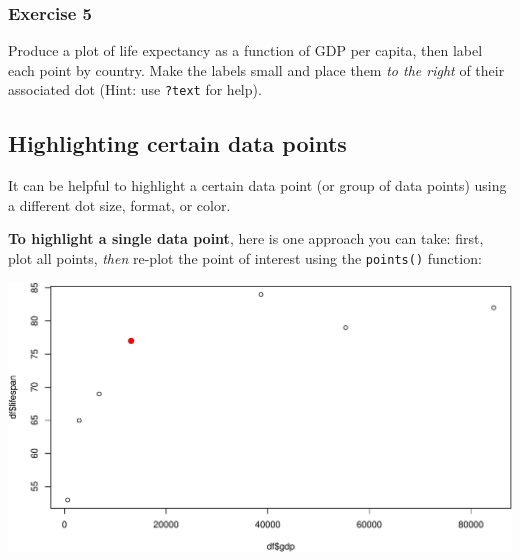 \documentclass[
]{book}
\newenvironment{Shaded}{\begin{snugshade}}{\end{snugshade}}
\newcommand{\AttributeTok}[1]{\textcolor[rgb]{0.77,0.63,0.00}{#1}}
\newcommand{\DecValTok}[1]{\textcolor[rgb]{0.00,0.00,0.81}{#1}}
\newcommand{\FloatTok}[1]{\textcolor[rgb]{0.00,0.00,0.81}{#1}}
\newcommand{\FunctionTok}[1]{\textcolor[rgb]{0.00,0.00,0.00}{#1}}
\newcommand{\NormalTok}[1]{#1}
\newcommand{\SpecialCharTok}[1]{\textcolor[rgb]{0.00,0.00,0.00}{#1}}
\newcommand{\StringTok}[1]{\textcolor[rgb]{0.31,0.60,0.02}{#1}}
\begin{document}
\hypertarget{exercise-5-1}{%
\subsubsection*{Exercise 5}\label{exercise-5-1}}

Produce a plot of life expectancy as a function of GDP per capita, then label each point by country. Make the labels small and place them \emph{to the right} of their associated dot (Hint: use \texttt{?text} for help).

\hypertarget{highlighting-certain-data-points}{%
\subsection*{Highlighting certain data points}\label{highlighting-certain-data-points}}

It can be helpful to highlight a certain data point (or group of data points) using a different dot size, format, or color.

\textbf{To highlight a single data point}, here is one approach you can take: first, plot all points, \emph{then} re-plot the point of interest using the \texttt{points()} function:

\begin{Shaded}
\end{Shaded}

\includegraphics{figures/unnamed-chunk-120-1.pdf}
\end{document}
